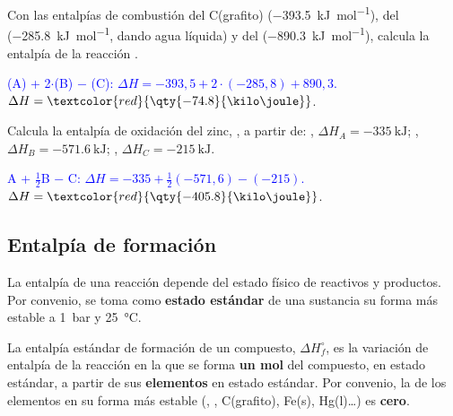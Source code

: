 \begin{exercise}
    Con las entalpías de combustión del C(grafito) (\qty{-393.5}{\kilo\joule\per\mol}), del 
    (\qty{-285.8}{\kilo\joule\per\mol}, dando agua líquida) y del  (\qty{-890.3}{\kilo\joule\per\mol}), calcula la
    entalpía de la reacción .
    \begin{solu}
        \textcolor{blue}{(A) + 2\(\cdot\)(B) \(-\) (C): \(\Delta H = -393{,}5 + 2 \cdot (-285{,}8) + 890{,}3\).}
        \(\Delta H = \textcolor{red}{\qty{-74.8}{\kilo\joule}}\).
    \end{solu}
\end{exercise}

\begin{exercise}
    Calcula la entalpía de oxidación del zinc, , a partir de:
    , \(\Delta H_A = \qty{-335}{\kilo\joule}\);
    , \(\Delta H_B = \qty{-571.6}{\kilo\joule}\);
    , \(\Delta H_C = \qty{-215}{\kilo\joule}\).
    \begin{solu}
        \textcolor{blue}{A + \(\frac{1}{2}\)B \(-\) C: \(\Delta H = -335 + \frac{1}{2}(-571{,}6) - (-215)\).}
        \(\Delta H = \textcolor{red}{\qty{-405.8}{\kilo\joule}}\).
    \end{solu}
\end{exercise}

\subsection{Entalpía de formación}

La entalpía de una reacción depende del estado físico de reactivos y productos. Por convenio, se toma como \textbf{estado estándar}
de una sustancia su forma más estable a \qty{1}{\bar} y \qty{25}{\degreeCelsius}.

\begin{definition}
    La entalpía estándar de formación de un compuesto, \(\Delta H_f^\circ\), es la variación de entalpía de la reacción en la que se
    forma \textbf{un mol} del compuesto, en estado estándar, a partir de sus \textbf{elementos} en estado estándar. Por convenio, la
    de los elementos en su forma más estable (, , C(grafito), Fe(s), Hg(l)…) es \textbf{cero}.
\end{definition}

